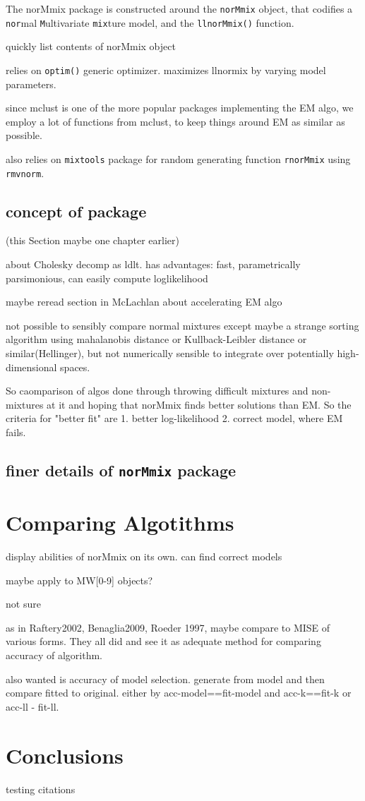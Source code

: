 The norMmix package is constructed around the {\tt norMmix} object, that codifies a {\tt nor}mal {\tt M}ultivariate {\tt mix}ture model,  and the {\tt llnorMmix()} function.

quickly list contents of norMmix object

relies on {\tt optim()} generic optimizer. maximizes llnormix by varying model parameters.

since mclust is one of the more popular packages implementing the EM algo, we employ a lot of functions from mclust, to keep things around EM as similar as possible.

also relies on {\tt mixtools} package for random generating function {\tt rnorMmix} using {\tt rmvnorm}.

\section{concept of package} (this Section maybe one chapter earlier)

about Cholesky decomp as ldlt. has advantages: fast, parametrically parsimonious, can easily compute loglikelihood

maybe reread section in McLachlan about accelerating EM algo

not possible to sensibly compare normal mixtures except maybe a strange sorting algorithm using mahalanobis distance or Kullback-Leibler distance or similar(Hellinger), but not numerically sensible to integrate over potentially high-dimensional spaces.

So caomparison of algos done through throwing difficult mixtures and non-mixtures at it and hoping that norMmix finds better solutions than EM. So the criteria for "better fit" are 1. better log-likelihood 2. correct model, where EM fails.

\section{finer details of {\tt norMmix} package}




\chapter{Comparing Algotithms}

display abilities of norMmix on its own. can find correct models

maybe apply to MW[0-9] objects?

not sure

as in Raftery2002, Benaglia2009, Roeder 1997, maybe compare to MISE of various forms. They all did and see it as adequate method for comparing accuracy of algorithm.

also wanted is accuracy of model selection. generate from model and then compare fitted to original. either by acc-model==fit-model and acc-k==fit-k or acc-ll - fit-ll.


\chapter{Conclusions}

testing citations
\cite{McL00} \cite{Ben09} \cite{Roe97}
